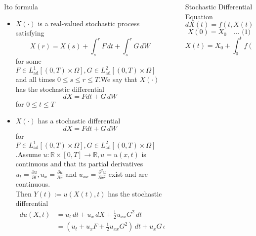 \documentclass[final]{beamer}
\newlength{\sepwidth}
\newlength{\colwidth}
\newcommand{\separatorcolumn}{\begin{column}{\sepwidth}\end{column}}
\begin{document}
\begin{frame}[t]
\begin{columns}[t]
\begin{column}{\colwidth}
\begin{block}{It$\hat{\text{o}}$ formula}
 \begin{itemize}
     \item $X(\cdot)$ is a real-valued stochastic process satisfying \[ X(r) = X(s) + \int_s^r F\,dt + \int_s^r G\,dW\] for some $F \in L^1_\text{ad}[(0,T)\times \Omega], G \in L^2_\text{ad}[(0,T)\times \Omega]$ and all times $0 \leq  s \leq r \leq T$.We say that $X(\cdot)$ has the stochastic differential 
     \[ dX = F dt + G\,dW\] for $0 \leq t \leq T$
     \item $X(\cdot)$ has a stochastic differential \[ dX = F dt + G\,dW\] for $F \in L^1_\text{ad}[(0,T)\times \Omega], G \in L^2_\text{ad}[(0,T)\times \Omega]$.Assume $u \colon \mathbb{R} \times [0,T] \rightarrow \mathbb{R}, u = u(x,t)$ is continuous and that its partial derivatives $u_t = \frac{\partial u}{\partial t}, u_x = \frac{\partial u}{\partial x}$ and $u_{xx} = \frac{\partial^2 u}{\partial x^2}$  exist and are continuous.\\
     Then $Y(t) := u(X(t),t)$ has the stochastic differential 
     \begin{align*}
         \,du(X,t) &= u_t\,dt + u_x\,dX + \frac{1}{2} u_{xx} G^2\,dt\\
         &= (u_t + u_x F + \frac{1}{2} u_{xx} G^2)\,dt + u_x G\,dW
     \end{align*}
 \end{itemize}





    
\end{block}




\end{column}

\separatorcolumn

\begin{column}{\colwidth}

  \begin{block}{Stochastic Differential Equation}
    \[dX(t) = f(t,X(t))\,dt + \sigma(t,X(t))\,dW_t, \quad t \in (0,T) \]  \[X(0) = X_0 \quad  \dots \text{ (1)} \] 
    \[X(t) = X_0 + \int_0^t f(s,X(s))\,ds + \int_0^t \sigma(s,X(s))\,dW_s \quad \text{almost surely in} \ P.\]
    

\end{block}
\end{column}
\end{columns}
\end{frame}
\end{document}
